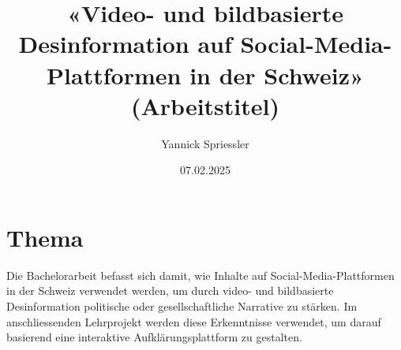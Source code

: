 \documentclass[12pt,a4paper]{article}        %
\title{«Video- und bildbasierte Desinformation auf Social-Media-Plattformen in der Schweiz» (Arbeitstitel)}        %
\author{Yannick Spriessler}     %
\date{07.02.2025}     %
\begin{document}
\begin{titlingpage} %
  
\end{titlingpage}
\pagebreak      %
\thispagestyle{empty}
\setcounter{page}{0}    %
\tableofcontents        %
\pagebreak

\section{Thema}
Die Bachelorarbeit befasst sich damit, wie Inhalte auf Social-Media-Plattformen in der Schweiz verwendet werden, um durch video- und bildbasierte Desinformation politische oder gesellschaftliche Narrative zu stärken. Im anschliessenden Lehrprojekt werden diese Erkenntnisse verwendet, um darauf basierend eine interaktive Aufklärungsplattform zu gestalten.
\end{document}
